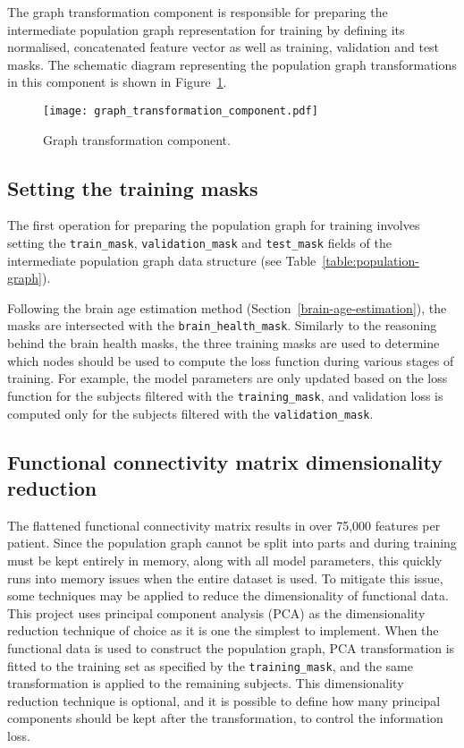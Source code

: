 The graph transformation component is responsible for preparing the intermediate population graph representation for training by defining its normalised, concatenated feature vector as well as training, validation and test masks. The schematic diagram representing the population graph transformations in this component is shown in Figure~\ref{graph-transformation-component}.

\begin{figure}[h]
    \centering
    \texttt{[image: graph\_transformation\_component.pdf]}
    \caption{Graph transformation component.}\label{graph-transformation-component}
\end{figure}

\subsection{Setting the training masks}
\label{setting-training-masks}
The first operation for preparing the population graph for training involves setting the \texttt{train\_mask}, \texttt{validation\_mask} and \texttt{test\_mask} fields of the intermediate population graph data structure (see Table~\ref{table:population-graph}). 

Following the brain age estimation method (Section~\ref{brain-age-estimation}), the masks are intersected with the \texttt{brain\_health\_mask}. Similarly to the reasoning behind the brain health masks, the three training masks are used to determine which nodes should be used to compute the loss function during various stages of training. For example, the model parameters are only updated based on the loss function for the subjects filtered with the \texttt{training\_mask}, and validation loss is computed only for the subjects filtered with the \texttt{validation\_mask}.

\subsection{Functional connectivity matrix dimensionality reduction}
The flattened functional connectivity matrix results in over 75,000 features per patient. Since the population graph cannot be split into parts and during training must be kept entirely in memory, along with all model parameters, this quickly runs into memory issues when the entire dataset is used. To mitigate this issue, some techniques may be applied to reduce the dimensionality of functional data. This project uses principal component analysis (PCA) as the dimensionality reduction technique of choice as it is one the simplest to implement. When the functional data is used to construct the population graph, PCA transformation is fitted to the training set as specified by the \texttt{training\_mask}, and the same transformation is applied to the remaining subjects. This dimensionality reduction technique is optional, and it is possible to define how many principal components should be kept after the transformation, to control the information loss.

